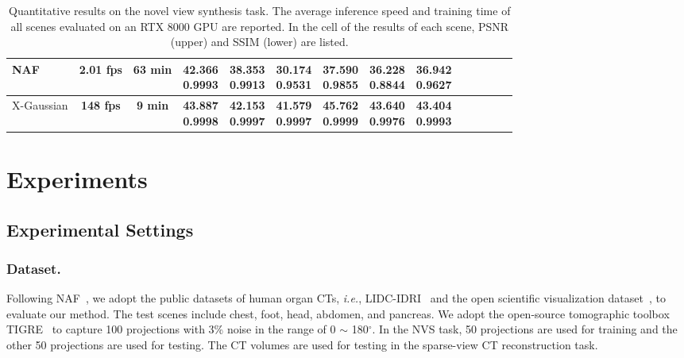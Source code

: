 \documentclass[runningheads]{llncs}
\begin{document}
\begin{table}[t]
{\begin{tabular}{lccccccccccccc}
			\midrule[0.1em]
			NAF~\cite{naf}  & {2.01 fps} & {63 min} & \tabincell{c}{{42.366}\\{0.9993}} & \tabincell{c}{38.353\\0.9913} & \tabincell{c}{30.174\\0.9531} &\tabincell{c}{{37.590}\\{0.9855}} &\tabincell{c}{36.228\\0.8844} &\tabincell{c}{36.942\\0.9627} \\
			\midrule[0.1em]
			\rowcolor{rouse}
			X-Gaussian & \bf 148 fps & \bf 9 min & \tabincell{c}{\bf 43.887\\ \bf 0.9998} & \tabincell{c}{\bf 42.153 \\ \bf 0.9997} & \tabincell{c}{\bf 41.579 \\ \bf 0.9997} & \tabincell{c}{\bf 45.762 \\ \bf 0.9999} & \tabincell{c}{\bf 43.640 \\ \bf 0.9976} & \tabincell{c}{\bf 43.404 \\ \bf 0.9993}\\
			\bottomrule[0.2em]
		\end{tabular}
	}
	\vspace{2mm}
	\caption{Quantitative results on the novel view synthesis task. The average inference speed and training time of all scenes evaluated on an RTX 8000 GPU are reported. In the cell of the results of each scene, PSNR (upper) and SSIM (lower) are listed.}
	\label{tab:proj_compare}
	\vspace{-7mm}
\end{table}



\vspace{-3mm}
\section{Experiments}
\vspace{-2mm}

\subsection{Experimental Settings}
\vspace{-1mm}

\subsubsection{Dataset.} Following NAF~\cite{naf}, we adopt the public datasets of human organ CTs, \emph{i.e.}, LIDC-IDRI~\cite{LIDC-IDRI} and the open scientific visualization dataset~\cite{osvd}, to evaluate our method. The test scenes include chest, foot, head, abdomen, and pancreas. We adopt the open-source tomographic toolbox TIGRE~\cite{tigre} to capture 100 projections with 3\% noise in the range of 0 $\sim$ 180$^\circ$. In the NVS task, 50 projections are used for training and the other 50 projections are used for testing. The CT volumes are used for testing in the sparse-view CT reconstruction task.
\end{document}
